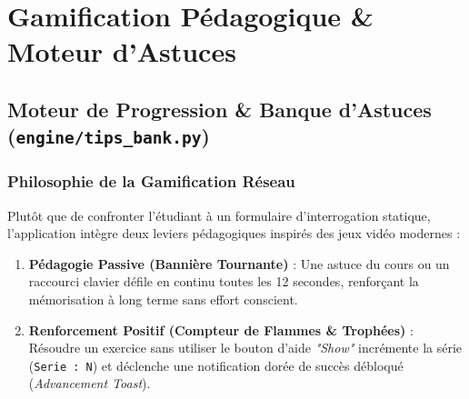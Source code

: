 \documentclass[11pt,a4paper]{report}
\begin{document}
\part{Gamification P\'edagogique \& Moteur d'Astuces}

\chapter{Moteur de Progression \& Banque d'Astuces (\texttt{engine/tips\_bank.py})}

\section{Philosophie de la Gamification R\'eseau}
Plut\^ot que de confronter l'\'etudiant \`a un formulaire d'interrogation statique, l'application int\`egre deux leviers p\'edagogiques inspir\'es des jeux vid\'eo modernes :
\begin{enumerate}
    \item \textbf{P\'edagogie Passive (Banni\`ere Tournante)} : Une astuce du cours ou un raccourci clavier d\'efile en continu toutes les 12 secondes, renfor\c{c}ant la m\'emorisation \`a long terme sans effort conscient.
    \item \textbf{Renforcement Positif (Compteur de Flammes \& Troph\'ees)} : R\'esoudre un exercice sans utiliser le bouton d'aide \textit{"Show"} incr\'emente la s\'erie (\texttt{Serie : N}) et d\'eclenche une notification dor\'ee de succ\`es d\'ebloqu\'e (\textit{Advancement Toast}).
\end{enumerate}
\end{document}
